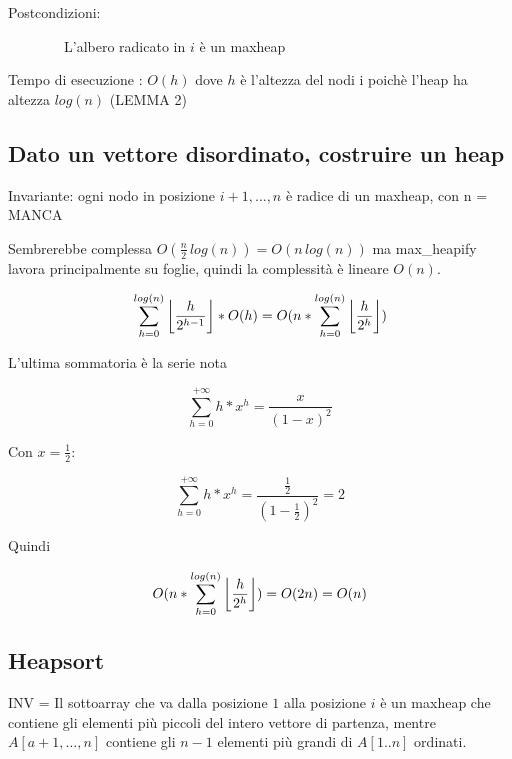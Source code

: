 {Postcondizioni:}

{~~~~~~~~L'albero radicato in $i$ è un maxheap}



{Tempo di esecuzione : $O(h)$ dove $h$ è l'altezza del nodi i poichè l'heap ha altezza $log(n)$ (LEMMA 2)}

\subsection{Dato un vettore disordinato, costruire un heap}



{Invariante: ogni nodo in posizione $i+1,\ldots,n$ è radice di un maxheap, con n = MANCA}

{Sembrerebbe complessa $O(\frac{n}{2}\,log(n)) = O(n\,log(n))$ ma max\_heapify lavora principalmente su foglie, quindi la complessità è lineare $O(n)$.}

\begin{equation}
\sum_{h=0}^{log(n)}{\floor*{\frac{h}{2^{h-1}}}*O(h)} = O(n*\sum_{h=0}^{log(n)}{\floor*{\frac{h}{2^h}})}
\end{equation}

{L'ultima sommatoria è la serie nota}

\begin{equation}
\sum_{h=0}^{+\infty}{h*x^h} = \frac{x}{{(1-x)}^2}
\end{equation}

{Con $x=\frac{1}{2}$:}

\begin{equation}
\sum_{h=0}^{+\infty}{h*x^h} = \frac{\frac{1}{2}}{{(1-\frac{1}{2})}^2} = 2
\end{equation}

{Quindi}

\begin{equation}
O(n*\sum_{h=0}^{log(n)}{\floor*{\frac{h}{2^h}}}) = O(2n) = O(n)
\end{equation}

\subsection{Heapsort}



{INV = Il sottoarray che va dalla posizione $1$ alla posizione $i$ è un maxheap che contiene gli elementi più piccoli del intero vettore di partenza, mentre $A[a+1,\ldots,n]$ contiene gli $n-1$ elementi più grandi di $A[1..n]$ ordinati}{.}


